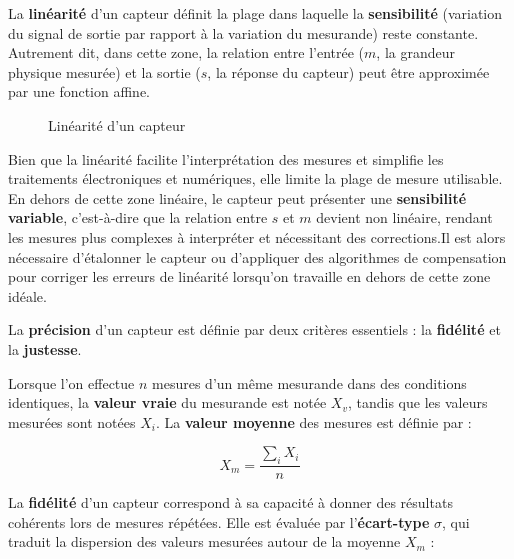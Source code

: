 La \textbf{linéarité} d'un capteur définit la plage dans laquelle la 
\textbf{sensibilité} (variation du signal de sortie par rapport à la variation 
du mesurande) reste constante. Autrement dit, dans cette zone, la relation entre 
l'entrée (\( m \), la grandeur physique mesurée) et la sortie (\( s \), la
réponse du capteur) peut être approximée par une fonction affine.\par

\begin{figure}[!ht]
    \caption{Linéarité d'un capteur}
    \label{fig:lineaire}
\end{figure}

Bien que la linéarité facilite l'interprétation des mesures et simplifie les 
traitements électroniques et numériques, elle limite la plage de mesure utilisable. 
En dehors de cette zone linéaire, le capteur peut présenter une 
\textbf{sensibilité variable}, c'est-à-dire que la relation entre \( s \) et
\( m \) devient non linéaire, rendant les mesures plus complexes à interpréter 
et nécessitant des corrections.Il est alors nécessaire
d'étalonner le capteur ou d'appliquer des algorithmes de compensation pour 
corriger les erreurs de linéarité lorsqu'on travaille en dehors de cette zone 
idéale.

La \textbf{précision} d'un capteur est définie par deux critères essentiels : 
la \textbf{fidélité} et la \textbf{justesse}.  

Lorsque l'on effectue \( n \) mesures d'un même mesurande dans des conditions 
identiques, la \textbf{valeur vraie} du mesurande est notée \( X_v \), tandis 
que les valeurs mesurées sont notées \( X_i \). La \textbf{valeur moyenne} des 
mesures est définie par :  

\[
X_m = \frac{\sum_{i} X_i}{n}
\]

La \textbf{fidélité} d'un capteur correspond à sa capacité à donner des 
résultats cohérents lors de mesures répétées. Elle est évaluée par 
l'\textbf{écart-type} \( \sigma \), qui traduit la dispersion des valeurs 
mesurées autour de la moyenne \( X_m \) :  

